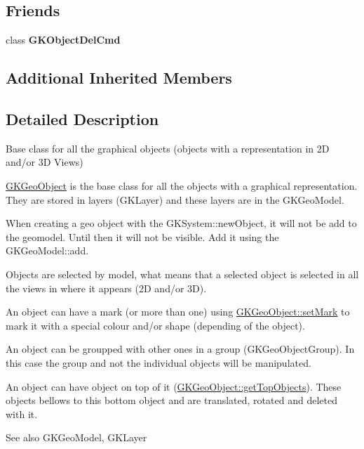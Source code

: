 \subsection*{Friends}
\begin{DoxyCompactItemize}
\item 
class {\bfseries G\+K\+Object\+Del\+Cmd}\hypertarget{classGKGeoObject_a59ce7d69e7de6e472cda5210ce7b00a6}{}\label{classGKGeoObject_a59ce7d69e7de6e472cda5210ce7b00a6}

\end{DoxyCompactItemize}
\subsection*{Additional Inherited Members}


\subsection{Detailed Description}
Base class for all the graphical objects (objects with a representation in 2D and/or 3D Views) 

\hyperlink{classGKGeoObject}{G\+K\+Geo\+Object} is the base class for all the objects with a graphical representation. They are stored in layers (G\+K\+Layer) and these layers are in the G\+K\+Geo\+Model.

When creating a geo object with the G\+K\+System\+::new\+Object, it will not be add to the geomodel. Until then it will not be visible. Add it using the G\+K\+Geo\+Model\+::add.

Objects are selected by model, what means that a selected object is selected in all the views in where it appears (2D and/or 3D).

An object can have a mark (or more than one) using \hyperlink{classGKGeoObject_aef22c197bc73c9282952b0d0308acabf}{G\+K\+Geo\+Object\+::set\+Mark} to mark it with a special colour and/or shape (depending of the object).

An object can be groupped with other ones in a group (G\+K\+Geo\+Object\+Group). In this case the group and not the individual objects will be manipulated.

An object can have object on top of it (\hyperlink{classGKGeoObject_a4ad5c1d5ddb758e4b0eb1c568ea02a57}{G\+K\+Geo\+Object\+::get\+Top\+Objects}). These objects bellows to this bottom object and are translated, rotated and deleted with it.

\begin{DoxySeeAlso}{See also}
G\+K\+Geo\+Model, G\+K\+Layer 
\end{DoxySeeAlso}


